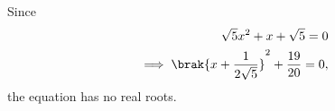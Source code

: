 Since
\begin{align}
    \sqrt{5}x^2 + x + \sqrt{5} = 0\\
\implies    \brak{x + \frac{1}{2\sqrt{5}}}^2 + \frac{19}{20} = 0,
\end{align}
the equation has no real roots.
%



